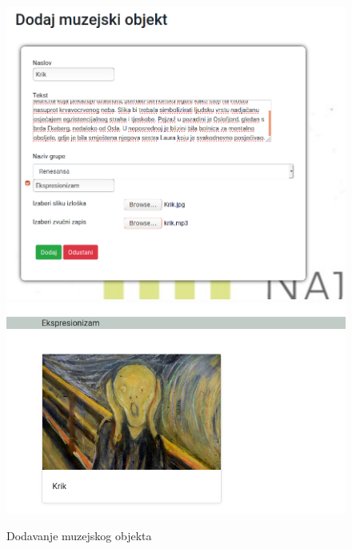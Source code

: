 			 \begin{figure}[H]
			 	\includegraphics[scale=0.25]{slike/dodavanje1.png}
			 	\includegraphics[scale=0.25]{slike/dodavanje2.png}
			 	\centering
			 	\caption{Dodavanje muzejskog objekta}
			 	\label{fig:promjene}
			 \end{figure}
		 
		 
		 
